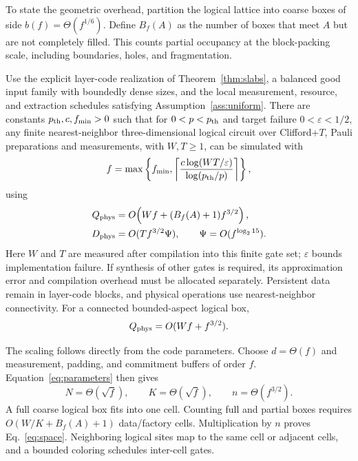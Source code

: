 To state the geometric overhead, partition the logical lattice into coarse
boxes of side $b(f)=\Theta(f^{1/6})$. Define $B_f(A)$ as the number of boxes
that meet $A$ but are not completely filled. This counts partial occupancy
at the block-packing scale, including boundaries, holes, and fragmentation.

\begin{theorem}
\label{thm:architecture}
Use the explicit layer-code realization of Theorem~\ref{thm:slabs}, a
balanced good input family with boundedly dense sizes, and the local
measurement, resource, and extraction schedules satisfying
Assumption~\ref{ass:uniform}. There are constants
$p_{\rm th},c,f_{\min}>0$ such that for $0<p<p_{\rm th}$ and target failure
$0<\varepsilon<1/2$, any finite nearest-neighbor three-dimensional logical
circuit over Clifford+$T$, Pauli preparations and measurements, with
$W,T\ge1$, can be simulated with
\begin{equation}
 f=\max\left\{f_{\min},
 \left\lceil\frac{c\log(WT/\varepsilon)}{\log(p_{\rm th}/p)}\right\rceil
 \right\},
 \label{eq:f}
\end{equation}
using
\begin{align}
 Q_{\rm phys}&=O\!\left(Wf+(B_f(A)+1)f^{3/2}\right),
 \label{eq:space}\\
 D_{\rm phys}&=O(Tf^{3/2}\Psi),\qquad \Psi=O(f^{\log_215}).
 \label{eq:depth}
\end{align}
Here $W$ and $T$ are measured after compilation into this finite gate set;
$\varepsilon$ bounds implementation failure. If synthesis of other gates
is required, its approximation error and compilation overhead must be
allocated separately. Persistent data remain in layer-code blocks, and physical operations use
nearest-neighbor connectivity. For a connected bounded-aspect logical box,
\begin{equation}
 Q_{\rm phys}=O(Wf+f^{3/2}).
 \label{eq:box-space}
\end{equation}
\end{theorem}

The scaling follows directly from the code parameters. Choose
$d=\Theta(f)$ and measurement, padding, and commitment buffers of order $f$.
Equation~\eqref{eq:parameters} then gives
\begin{equation}
 N=\Theta(\sqrt f),\qquad K=\Theta(\sqrt f),\qquad n=\Theta(f^{3/2}).
 \label{eq:chosen-size}
\end{equation}
A full coarse logical box fits into one cell. Counting full and partial
boxes requires $O(W/K+B_f(A)+1)$ data/factory cells. Multiplication by
$n$ proves Eq.~\eqref{eq:space}. Neighboring logical sites map to the same
cell or adjacent cells, and a bounded coloring schedules inter-cell gates.



